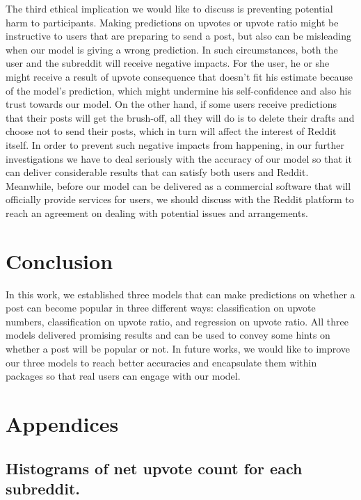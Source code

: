 \documentclass[11pt,a4paper]{article}
\let\Oldsection\section
\renewcommand{\section}{\FloatBarrier\Oldsection}
\let\Oldsubsection\subsection
\renewcommand{\subsection}{\FloatBarrier\Oldsubsection}
\begin{document}
    The third ethical implication we would like to discuss is preventing potential harm to participants. Making predictions on upvotes or upvote ratio might be instructive to users that are preparing to send a post, but also can be misleading when our model is giving a wrong prediction. In such circumstances, both the user and the subreddit will receive negative impacts. For the user, he or she might receive a result of upvote consequence that doesn’t fit his estimate because of the model’s prediction, which might undermine his self-confidence and also his trust towards our model. On the other hand, if some users receive predictions that their posts will get the brush-off, all they will do is to delete their drafts and choose not to send their posts, which in turn will affect the interest of Reddit itself. In order to prevent such negative impacts from happening, in our further investigations we have to deal seriously with the accuracy of our model so that it can deliver considerable results that can satisfy both users and Reddit. Meanwhile, before our model can be delivered as a commercial software that will officially provide services for users, we should discuss with the Reddit platform to reach an agreement on dealing with potential issues and arrangements.

    
\Oldsection{Conclusion}
    In this work, we established three models that can make predictions on whether a post can become popular in three different ways: classification on upvote numbers, classification on upvote ratio, and regression on upvote ratio. All three models delivered promising results and can be used to convey some hints on whether a post will be popular or not. In future works, we would like to improve our three models to reach better accuracies and encapsulate them within packages so that real users can engage with our model. 




\onecolumn

\appendix

\section{Appendices}
    \subsection{Histograms of net upvote count for each subreddit.}
    \label{sec:appdata}
\end{document}
